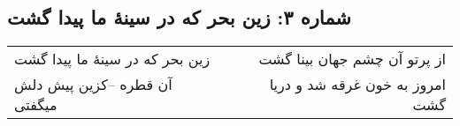 \begin{center}
\section*{شماره ۳: زین بحر که در سینۀ ما پیدا گشت}
\label{sec:003}
\begin{longtable}{l p{0.5cm} r}
زین بحر که در سینهٔ ما پیدا گشت
&&
از پرتو آن چشم جهان بینا گشت
\\
آن قطره –کزین پیش دلش میگفتی
&&
امروز به خون غرقه شد و دریا گشت
\\
\end{longtable}
\end{center}
